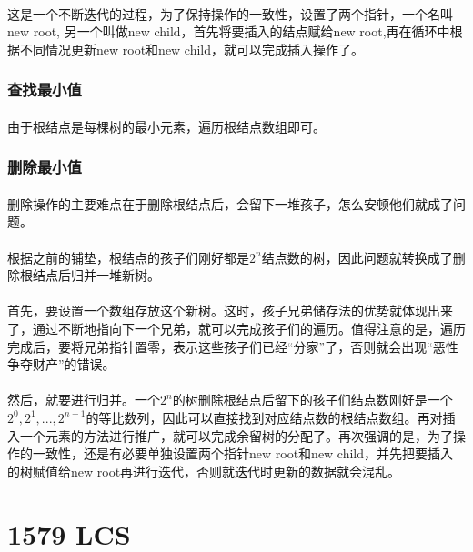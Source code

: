 \documentclass[UTF-8, 12pt]{ctexart}
\begin{document}
    \paragraph{}
    这是一个不断迭代的过程，为了保持操作的一致性，设置了两个指针，一个名叫new root, 另一个叫做new child，首先将要插入的结点赋给new root,再在循环中根据不同情况更新new root和new child，就可以完成插入操作了。
    	\subsubsection{查找最小值}
    \paragraph{}
    由于根结点是每棵树的最小元素，遍历根结点数组即可。
    	\subsubsection{删除最小值}
    \paragraph{}
    删除操作的主要难点在于删除根结点后，会留下一堆孩子，怎么安顿他们就成了问题。
    \paragraph{}
    根据之前的铺垫，根结点的孩子们刚好都是$2^n$结点数的树，因此问题就转换成了删除根结点后归并一堆新树。
    \paragraph{}
    首先，要设置一个数组存放这个新树。这时，孩子兄弟储存法的优势就体现出来了，通过不断地指向下一个兄弟，就可以完成孩子们的遍历。值得注意的是，遍历完成后，要将兄弟指针置零，表示这些孩子们已经“分家”了，否则就会出现“恶性争夺财产”的错误。
    \paragraph{}
    然后，就要进行归并。一个$2^n$的树删除根结点后留下的孩子们结点数刚好是一个$2^0, 2^1, ..., 2^{n-1}$的等比数列，因此可以直接找到对应结点数的根结点数组。再对插入一个元素的方法进行推广，就可以完成余留树的分配了。再次强调的是，为了操作的一致性，还是有必要单独设置两个指针new root和new child，并先把要插入的树赋值给new root再进行迭代，否则就迭代时更新的数据就会混乱。
    
\section{1579 LCS}
\end{document}
